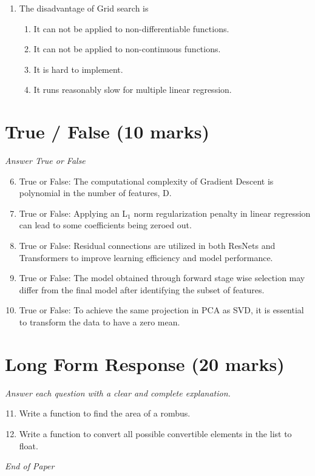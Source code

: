 \documentclass[12pt]{article}
\begin{document}
\begin{enumerate}[label=\arabic*.]
\begin{enumerate}[label=(\alph*)]
    \item False, False
    \item True, False
    \item False, True
\end{enumerate}
\item The disadvantage of Grid search is
\begin{enumerate}[label=(\alph*)]
    \item It can not be applied to non-differentiable functions.
    \item It can not be applied to non-continuous functions.
    \item It is hard to implement.
    \item It runs reasonably slow for multiple linear regression.
\end{enumerate}
\end{enumerate}

\section*{True / False (10 marks)}
\textit{Answer True or False}
\begin{enumerate}[label=\arabic*.]
\setcounter{enumi}{5}
\item True or False: The computational complexity of Gradient Descent is polynomial in the number of features, D.
\item True or False: Applying an L$_{1}$ norm regularization penalty in linear regression can lead to some coefficients being zeroed out.
\item True or False: Residual connections are utilized in both ResNets and Transformers to improve learning efficiency and model performance.
\item True or False: The model obtained through forward stage wise selection may differ from the final model after identifying the subset of features.
\item True or False: To achieve the same projection in PCA as SVD, it is essential to transform the data to have a zero mean.
\end{enumerate}

\section*{Long Form Response (20 marks)}
\textit{Answer each question with a clear and complete explanation.}
\begin{enumerate}[label=\arabic*.]
\setcounter{enumi}{10}
\item Write a function to find the area of a rombus.
\item Write a function to convert all possible convertible elements in the list to float.
\end{enumerate}

\vfill
\noindent\textit{End of Paper}
\end{document}
